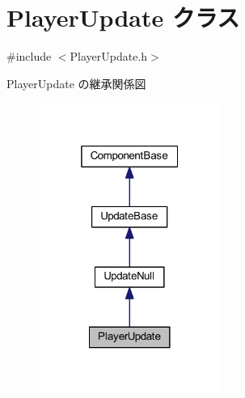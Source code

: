 \hypertarget{class_player_update}{}\section{Player\+Update クラス}
\label{class_player_update}


{\ttfamily \#include $<$Player\+Update.\+h$>$}



Player\+Update の継承関係図\nopagebreak
\begin{figure}[H]
\begin{center}
\leavevmode
\includegraphics[width=169pt]{class_player_update__inherit__graph}
\end{center}
\end{figure}
